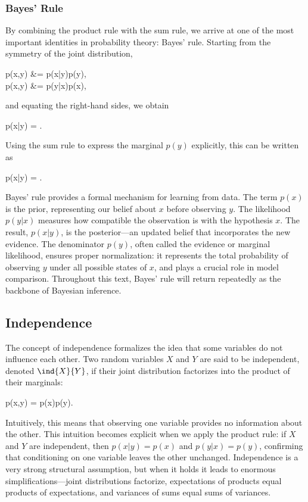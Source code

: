 \subsubsection*{Bayes' Rule}

By combining the product rule with the sum rule, we arrive at one of the most important identities in probability theory: \alert{Bayes' rule}. Starting from the symmetry of the joint distribution,
\begin{myalign}
p(x,y) &= p(x|y)p(y), \\
p(x,y) &= p(y|x)p(x),
\end{myalign}
and equating the right-hand sides, we obtain
\begin{myequation}
p(x|y) = .
\end{myequation}
Using the sum rule to express the marginal $p(y)$ explicitly, this can be written as
\begin{myequation}
p(x|y) = .
\end{myequation}

Bayes' rule provides a formal mechanism for learning from data. The term $p(x)$ is the \alert{prior}, representing our belief about $x$ before observing $y$. The likelihood $p(y|x)$ measures how compatible the observation is with the hypothesis $x$. The result, $p(x|y)$, is the \alert{posterior}---an updated belief that incorporates the new evidence. The denominator $p(y)$, often called the \alert{evidence} or marginal likelihood, ensures proper normalization: it represents the total probability of observing $y$ under all possible states of $x$, and plays a crucial role in model comparison. Throughout this text, Bayes' rule will return repeatedly as the backbone of Bayesian inference.

\subsection*{Independence}

The concept of independence formalizes the idea that some variables do not influence each other. Two random variables $X$ and $Y$ are said to be \alert{independent}, denoted $\ind{X}{Y}$, if their joint distribution factorizes into the product of their marginals:
\begin{myequation}
p(x,y) = p(x)p(y).
\end{myequation}
Intuitively, this means that observing one variable provides no information about the other. This intuition becomes explicit when we apply the product rule: if $X$ and $Y$ are independent, then $p(x|y) = p(x)$ and $p(y|x) = p(y)$, confirming that conditioning on one variable leaves the other unchanged. Independence is a very strong structural assumption, but when it holds it leads to enormous simplifications---joint distributions factorize, expectations of products equal products of expectations, and variances of sums equal sums of variances.

